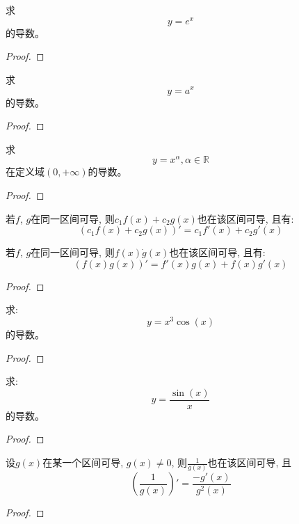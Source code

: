 \begin{proposition}
    求
    \[ y = e^x \]
    的导数。
\end{proposition}
\begin{proof}
    
\end{proof}

\begin{proposition}
    求
    \[ y = a^x \]
    的导数。    
\end{proposition}
\begin{proof}
    
\end{proof}

\begin{proposition}
    求
    \[ y = x^\alpha, \alpha \in \mathbb{R} \]
    在定义域$(0, +\infty)$的导数。 
\end{proposition}
\begin{proof}
    
\end{proof}

\begin{theorem}
    若$f$, $g$在同一区间可导, 则$c_1f(x)+c_2g(x)$也在该区间可导, 且有:
    \[ \left(c_1 f(x) + c_2 g(x) \right)' = c_1 f'(x) +c_2 g'(x) \]
\end{theorem}

\begin{theorem}
    若$f$, $g$在同一区间可导, 则$f(x)\dot g(x)$也在该区间可导, 且有:
    \[ \left(f(x) g(x) \right)' = f'(x) g(x) + f(x) g'(x) \]
\end{theorem}
\begin{proof}
    
\end{proof}

\begin{proposition}
    求:
    \[ y = x^3\cos(x) \]
    的导数。
\end{proposition}
\begin{proof}
    
\end{proof}

\begin{proposition}
    求:
    \[ y = \frac{\sin(x)}{x} \]
    的导数。
\end{proposition}
\begin{proof}
    
\end{proof}

\begin{theorem}
    设$g(x)$在某一个区间可导, $g(x) \neq 0$, 则$\frac{1}{g(x)}$也在该区间可导, 且
    \[ \left(\frac{1}{g(x)}\right)' = \frac{-g'(x)}{g^2(x)}\]
\end{theorem}
\begin{proof}
    
\end{proof}

